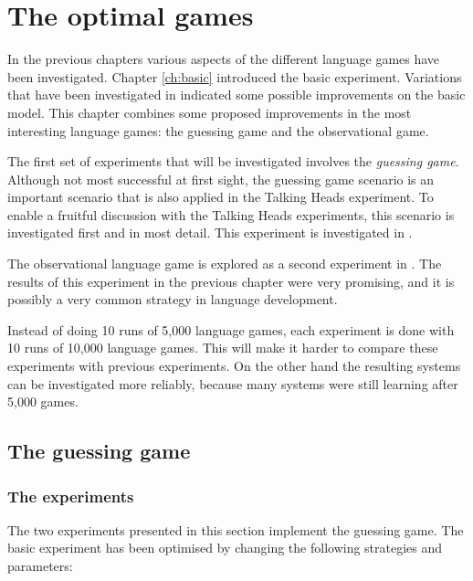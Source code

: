 \chapter{The optimal games}\label{ch:opt}

In the previous chapters various aspects of the different language games have been investigated. Chapter \ref{ch:basic} introduced the basic experiment. Variations that have been investigated in  indicated some possible improvements on the basic model. This chapter combines some proposed improvements in the most interesting language games: the guessing game and the observational game.

The first set of experiments that will be investigated involves the {\em guessing game}. Although not most successful at first sight, the guessing game scenario is an important scenario that is also applied in the Talking Heads experiment. To enable a fruitful discussion with the Talking Heads experiments, this scenario is investigated first and in most detail. This experiment is investigated in .

The observational language game is explored as a second experiment in . The results of this experiment in the previous chapter were very promising, and it is possibly a very common strategy in language development.


  Instead of doing 10 runs of 5,000 language games, each experiment is done with 10 runs of 10,000 language games. This will make it harder to compare these experiments with previous experiments. On the other hand the resulting systems can be investigated more reliably, because many systems were still learning after 5,000 games. 


\section{The guessing game}\label{s:opt:gg}

\subsection{The experiments}

The two experiments presented in this section implement the guessing game. The basic experiment has been optimised by changing the following strategies and parameters:

